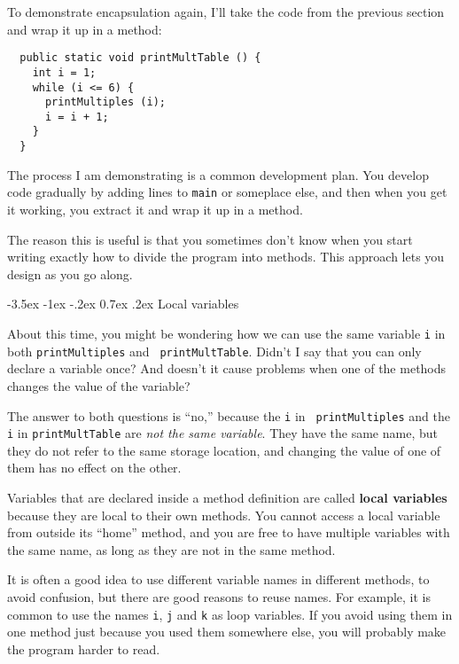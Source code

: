 \documentclass{book}
\makeatletter
\renewcommand{\section}{\@startsection 
    {section} {1} {0mm}%
    {-3.5ex \@plus -1ex \@minus -.2ex}%
    {0.7ex \@plus.2ex}%
    {\normalfont\Large\bfseries}}
\makeatother
\begin{document}
To demonstrate encapsulation again, I'll take the code
from the previous section and wrap it up in a method:

\begin{verbatim}
  public static void printMultTable () {
    int i = 1;
    while (i <= 6) {
      printMultiples (i);
      i = i + 1;
    }
  }
\end{verbatim}
%
The process I am demonstrating is a common 
development plan.  You develop code gradually by adding
lines to {\tt main} or someplace else, and then when you get
it working, you extract it and wrap it up in a method.

The reason this is useful is that you sometimes don't know
when you start writing exactly how to divide the program into
methods.  This approach lets you design as you go along.

\section{Local variables}

About this time, you might be wondering how we can use the same
variable {\tt i} in both {\tt printMultiples} and {\tt
printMultTable}.  Didn't I say that you can only declare a variable
once?  And doesn't it cause problems when one of the methods changes
the value of the variable?

The answer to both questions is ``no,'' because the {\tt i} in {\tt
printMultiples} and the {\tt i} in {\tt printMultTable} are
{\em not the same variable}.  They have the same name, but
they do not refer to the same storage location, and changing
the value of one of them has no effect on the other.


Variables that are declared inside a method definition are
called {\bf local variables} because they are local to their
own methods.  You cannot access a local variable from outside
its ``home'' method, and you are free to have multiple
variables with the same name, as long as they are not in
the same method.

It is often a good idea to use different variable names in
different methods, to avoid confusion, but there are good
reasons to reuse names.  For example, it is common to
use the names {\tt i}, {\tt j} and {\tt k} as loop variables.
If you avoid using them in one method just because you
used them somewhere else, you will probably make the program
harder to read.
\end{document}
